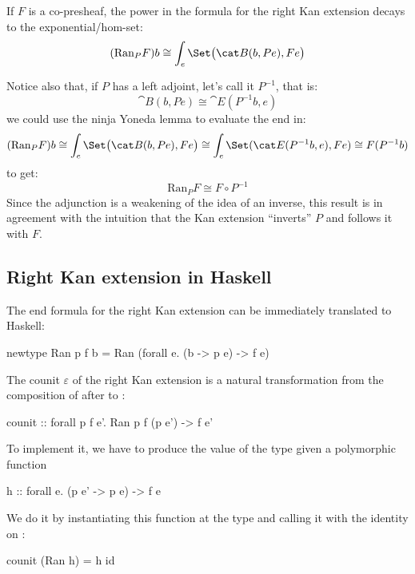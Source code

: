 \documentclass[DaoFP]{subfiles}
\begin{document}
If $F$ is a co-presheaf, the power in the formula for the right Kan extension decays to the exponential/hom-set:
  \[ (\text{Ran}_P F) b \cong \int_e \Set \big( \cat B (b, P e), F e\big) \]
 
 Notice also that, if $P$ has a left adjoint, let's call it $P^{-1}$, that is:
 \[ \cat B(b, P e) \cong \cat E(P^{-1} b, e) \]
 we could use the ninja Yoneda lemma to evaluate the end in:
 \[ (\text{Ran}_P F) b \cong \int_e \Set \big( \cat B (b, P e), F e\big) \cong \int_e \Set(\cat E(P^{-1} b, e), F e) \cong F(P^{-1} b)\]
to get:
 \[  \text{Ran}_P F \cong F \circ P^{-1} \]
 Since the adjunction is a weakening of the idea of an inverse, this result is in agreement with the intuition that the Kan extension ``inverts'' $P$ and follows it with $F$.
 
 \subsection{Right Kan extension in Haskell}
The end formula for the right Kan extension can be immediately translated to Haskell:
 \begin{haskell}
newtype Ran p f b = Ran (forall e. (b -> p e) -> f e)
 \end{haskell}
 
 The counit $\varepsilon$ of the right Kan extension is a natural transformation from the composition of  after  to :
 \begin{haskell}
counit :: forall p f e'. Ran p f (p e') -> f e'
\end{haskell}
To implement it, we have to produce the value of the type  given a polymorphic function 
 \begin{haskell}
h :: forall e. (p e' -> p e) -> f e
\end{haskell}
We do it by instantiating this function at the type  and calling it with the identity on :
 \begin{haskell}
counit (Ran h) = h id
\end{haskell}
\end{document}
